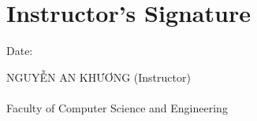 \chapter*{Instructor’s Signature}

\vspace{1cm}

\makebox[0.7\linewidth][l]{\hrulefill} Date: \makebox[0.2\linewidth][l]{\hrulefill}

    \begin{flushleft}
     NGUYỄN AN KHƯƠNG (Instructor)\\
    \makebox[0.45\linewidth][l]{\hrulefill} \\
    Faculty of Computer Science and Engineering
    \end{flushleft}
